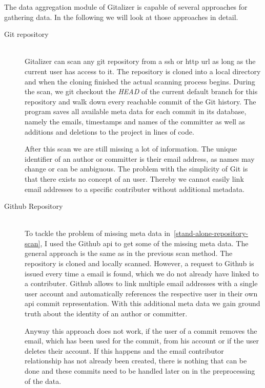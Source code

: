 The data aggregation module of Gitalizer is capable of several approaches for gathering data.
In the following we will look at those approaches in detail.

\begin{description}
    \item[Git repository]\label{stand-alone-repository-scan} \hfill \\
        Gitalizer can scan any git repository from a \ac{ssh} or \ac{http} \acs{url} as long as the current user has access to it.
        The repository is cloned into a local directory and when the cloning finished the actual scanning process begins.
        During the scan, we git checkout the \emph{HEAD} of the current default branch for this repository and walk down every reachable commit of the Git history.
        The program saves all available meta data for each commit in its database, namely the emails, timestamps and names of the committer as well as additions and deletions to the project in lines of code.

        After this scan we are still missing a lot of information.
        The unique identifier of an author or committer is their email address, as names may change or can be ambiguous.
        The problem with the simplicity of Git is that there exists no concept of an user.
        Thereby we cannot easily link email addresses to a specific contributer without additional metadata.


    \item[Github Repository]\label{github-repo-scan} \hfill \\
        To tackle the problem of missing meta data in~\ref{stand-alone-repository-scan}, I used the Github \ac{api} to get some of the missing meta data.
        The general approach is the same as in the previous scan method. The repository is cloned and locally scanned.
        However, a request to Github is issued every time a email is found, which we do not already have linked to a contributer.
        Github allows to link multiple email addresses with a single user account and automatically references the respective user in their own \ac{api} commit representation.
        With this additional meta data we gain ground truth about the identity of an author or committer.

        Anyway this approach does not work, if the user of a commit removes the email, which has been used for the commit, from his account or if the user deletes their account.
        If this happens and the email contributor relationship has not already been created, there is nothing that can be done and these commits need to be handled later on in the preprocessing of the data.


\end{description}
